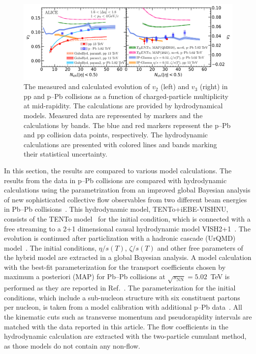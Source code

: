 \begin{figure}[h!]
	\centering
	\includegraphics[width=1.0\textwidth]{figures/Fig6_v2Mult_allSystems_Hydro.pdf} 
	\caption{The measured and calculated evolution of $v_2$ (left) and $v_3$ (right) in pp and p--Pb collisions as a function of charged-particle multiplicity at mid-rapidity. The calculations are provided by hydrodynamical models. Measured data are represented by markers and the calculations by bands.
    The blue and red markers represent the p--Pb and pp collision data points, respectively. The hydrodynamic calculations are presented with colored lines and bands marking their statistical uncertainty.} 
	\label{fig:vnmult_model}
\end{figure}

In this section, the results are compared to various model calculations.
The results from the data in p--Pb collisions are compared with hydrodynamic calculations using the parametrization from an improved global
Bayesian analysis of new sophisticated collective flow observables
 from two different beam energies in Pb--Pb collisions~\cite{Parkkila:2021yha}. This hydrodynamic model, {TENTo}+iEBE-VISHNU, consists of the {TENTo} model~\cite{Moreland:2014oya} for the initial condition, which is connected with a free streaming to a 2+1 dimensional causal hydrodynamic model VISH2+1~\cite{Shen:2014vra}. The evolution is continued after particlization with a hadronic cascade (UrQMD) model~\cite{Bass:1998ca,Bleicher:1999xi}. The initial conditions, $\eta/s(T)$, $\zeta/s(T)$ and other free parameters of the hybrid model are extracted in a global Bayesian analysis.
A model calculation with the best-fit parameterization for the transport coefficients chosen by maximum a posteriori (MAP) for Pb--Pb collisions at $\sqrt{s_{\text{NN}}}=5.02$~TeV is performed as they are reported in Ref.~\cite{Parkkila:2021yha}. The parameterization for the initial conditions, which include a sub-nucleon structure with six constituent partons per nucleon, is taken from a model calibration with additional p--Pb data~\cite{Moreland:2018gsh}. All the kinematic cuts such as transverse momentum and pseudorapidity intervals are matched with the data reported in this article. The flow coefficients in the hydrodynamic calculation are extracted with the two-particle cumulant method, as those models do not contain any non-flow. %

